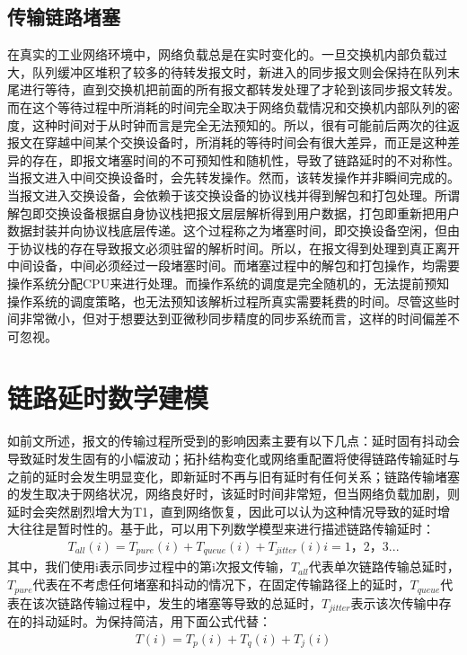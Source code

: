 \subsection{传输链路堵塞}
在真实的工业网络环境中，网络负载总是在实时变化的。一旦交换机内部负载过大，队列缓冲区堆积了较多的待转发报文时，新进入的同步报文则会保持在队列末尾进行等待，直到交换机把前面的所有报文都转发处理了才轮到该同步报文转发。而在这个等待过程中所消耗的时间完全取决于网络负载情况和交换机内部队列的密度，这种时间对于从时钟而言是完全无法预知的。所以，很有可能前后两次的往返报文在穿越中间某个交换设备时，所消耗的等待时间会有很大差异，而正是这种差异的存在，即报文堵塞时间的不可预知性和随机性，导致了链路延时的不对称性。当报文进入中间交换设备时，会先转发操作。然而，该转发操作并非瞬间完成的。当报文进入交换设备，会依赖于该交换设备的协议栈并得到解包和打包处理。所谓解包即交换设备根据自身协议栈把报文层层解析得到用户数据，打包即重新把用户数据封装并向协议栈底层传递。这个过程称之为堵塞时间，即交换设备空闲，但由于协议栈的存在导致报文必须驻留的解析时间。所以，在报文得到处理到真正离开中间设备，中间必须经过一段堵塞时间。而堵塞过程中的解包和打包操作，均需要操作系统分配CPU来进行处理。而操作系统的调度是完全随机的，无法提前预知操作系统的调度策略，也无法预知该解析过程所真实需要耗费的时间。尽管这些时间非常微小，但对于想要达到亚微秒同步精度的同步系统而言，这样的时间偏差不可忽视。

\section{链路延时数学建模}
如前文所述，报文的传输过程所受到的影响因素主要有以下几点：延时固有抖动会导致延时发生固有的小幅波动；拓扑结构变化或网络重配置将使得链路传输延时与之前的延时会发生明显变化，即新延时不再与旧有延时有任何关系；链路传输堵塞的发生取决于网络状况，网络良好时，该延时时间非常短，但当网络负载加剧，则延时会突然剧烈增大为T1，直到网络恢复，因此可以认为这种情况导致的延时增大往往是暂时性的。基于此，可以用下列数学模型\supercite{33}来进行描述链路传输延时：
\begin {align}
T_{all}(i) = T_{pure}(i) + T_{queue}(i) + T_{jitter}(i)  i=1，2，3...
\end{align}
其中，我们使用i表示同步过程中的第i次报文传输，$T_{all}$代表单次链路传输总延时，$T_{pure}$代表在不考虑任何堵塞和抖动的情况下，在固定传输路径上的延时，$T_{queue}$代表在该次链路传输过程中，发生的堵塞等导致的总延时，$T_{jitter}$表示该次传输中存在的抖动延时。为保持简洁，用下面公式代替：
\begin {align}
T(i) = T_{p}(i) + T_{q}(i) + T_{j}(i)
\end{align}

